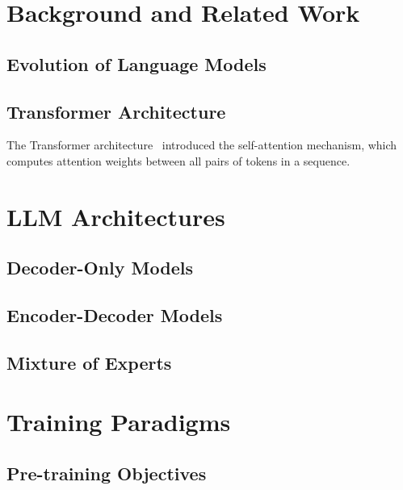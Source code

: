 \documentclass[conference]{IEEEtran}
\begin{document}
\section{Background and Related Work}
\label{sec:background}

\subsection{Evolution of Language Models}

\subsection{Transformer Architecture}
The Transformer architecture~\cite{vaswani2017attention} introduced the self-attention mechanism, which computes attention weights between all pairs of tokens in a sequence.

\section{LLM Architectures}
\label{sec:architectures}

\subsection{Decoder-Only Models}

\subsection{Encoder-Decoder Models}

\subsection{Mixture of Experts}

\section{Training Paradigms}
\label{sec:training}

\subsection{Pre-training Objectives}
\end{document}
